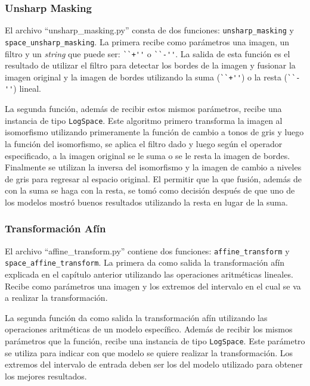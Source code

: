\subsubsection{Unsharp Masking}

El archivo ``unsharp\_masking.py'' consta de dos funciones: \verb|unsharp_masking| y \verb|space_unsharp_masking|. La primera recibe como par\'ametros una imagen, un filtro y un \textit{string} que puede ser: \verb|``+''| o \verb|``-''|. La salida de esta funci\'on es el resultado de utilizar el filtro para detectar los bordes de la imagen y fusionar la imagen original y la imagen de bordes utilizando la suma (\verb|``+''|) o la resta (\verb|``-''|) lineal. 

La segunda funci\'on, adem\'as de recibir estos mismos par\'ametros, recibe una instancia de tipo \verb|LogSpace|. Este algoritmo primero transforma la imagen al isomorfismo utilizando primeramente la funci\'on de cambio a tonos de gris y luego la funci\'on del isomorfismo, se aplica el filtro dado y luego seg\'un el operador especificado, a la imagen original se le suma o se le resta la imagen de bordes. Finalmente se utilizan la inversa del isomorfismo y la imagen de cambio a niveles de gris para regresar al espacio original. El permitir que la que fusi\'on, adem\'as de con la suma se haga con la resta, se tom\'o como decisi\'on despu\'es de que uno de los modelos mostr\'o buenos resultados utilizando la resta en lugar de la suma. 

\subsubsection{Transformaci\'on Af\'in}

El archivo ``affine\_transform.py'' contiene dos funciones: \verb|affine_transform| y \verb|space_affine_transform|. La primera da como salida la transformaci\'on af\'in explicada en el cap\'itulo anterior utilizando las operaciones aritm\'eticas lineales. Recibe como par\'ametros una imagen y los extremos del intervalo en el cual se va a realizar la transformaci\'on. 

La segunda funci\'on da como salida la transformaci\'on af\'in utilizando las operaciones aritm\'eticas de un modelo espec\'ifico. Adem\'as de recibir los mismos par\'ametros que la funci\'on, recibe una instancia de tipo \verb|LogSpace|. Este par\'ametro se utiliza para indicar con que modelo se quiere realizar la transformaci\'on. Los extremos del intervalo de entrada deben ser los del modelo utilizado para obtener los mejores resultados.

